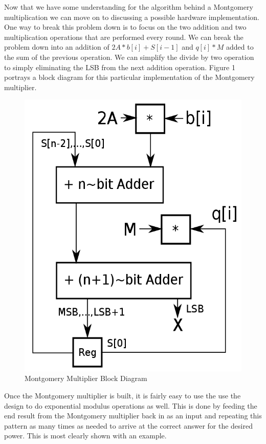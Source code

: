 \documentclass[journal]{IEEEtran}
\begin{document}
Now that we have some understanding for the algorithm behind a Montgomery multiplication we can move on to discussing a possible hardware implementation. One way to break this problem down is to focus on the two addition and two multiplication operations that are performed every round. We can break the problem down into an addition of $2A*b[i] + S[i-1]$ and $q[i]*M$ added to the sum of the previous operation. We can simplify the divide by two operation to simply eliminating the LSB from the next addition operation. Figure 1 portrays a block diagram for this particular implementation of the Montgomery multiplier. \\

	\begin{figure}[h]
		\centering
		\includegraphics[scale=0.2]{pics/Montgomery_exp_mult.png}
		\caption{Montgomery Multiplier Block Diagram}
	\end{figure}   


Once the Montgomery multiplier is built, it is fairly easy to use the use the design to do exponential modulus operations as well. This is done by feeding the end result from the Montgomery multiplier back in as an input and repeating this pattern as many times as needed to arrive at the correct answer for the desired power. This is most clearly shown with an example.  
\end{document}
